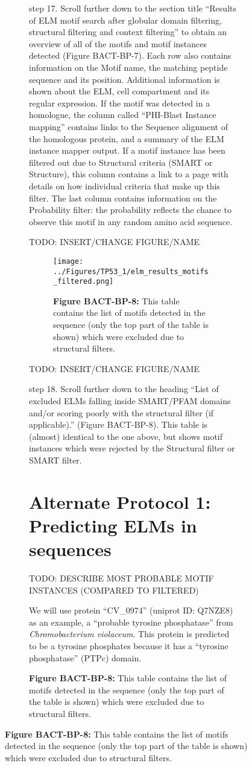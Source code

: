 {\begin{figure}[h!]
{{\begin{figure}[h!]
{{step 17. Scroll further down to the section title ``Results of ELM motif
search after globular domain filtering, structural filtering and context
filtering'' to obtain an overview of all of the motifs and motif
instances detected (Figure BACT-BP-7). Each row also contains
information on the Motif name, the matching peptide sequence and its
position. Additional information is shown about the ELM, cell
compartment and its regular expression. If the motif was detected in a
homologue, the column called ``PHI-Blast Instance mapping'' contains
links to the Sequence alignment of the homologous protein, and a summary
of the ELM instance mapper output. If a motif instance has been filtered
out due to Structural criteria (SMART or Structure), this column
contains a link to a page with details on how individual criteria that
make up this filter. The last column contains information on the
Probability filter: the probability reflects the chance to observe this
motif in any random amino acid sequence.

TODO: INSERT/CHANGE FIGURE/NAME

\begin{figure}[h!]
\centering
\texttt{[image: ../Figures/TP53\_1/elm\_results\_motifs\_filtered.png]}
\caption{
\textbf{Figure BACT-BP-8:} This table contains the list of motifs
detected in the sequence (only the top part of the table is shown) which
were excluded due to structural filters.
}
\end{figure}

TODO: INSERT/CHANGE FIGURE/NAME

step 18. Scroll further down to the heading ``List of excluded ELMs
falling inside SMART/PFAM domains and/or scoring poorly with the
structural filter (if applicable).'' (Figure BACT-BP-8). This table is
(almost) identical to the one above, but shows motif instances which
were rejected by the Structural filter or SMART filter.

\section{Alternate Protocol 1: Predicting ELMs in
sequences}\label{alternate-protocol-1-predicting-elms-in-sequences}

TODO: DESCRIBE MOST PROBABLE MOTIF INSTANCES (COMPARED TO FILTERED)

We will use protein ``CV\_0974'' (uniprot ID: Q7NZE8) as an example, a
``probable tyrosine phosphatase'' from \emph{Chromobacterium violaceum}.
This protein is predicted to be a tyrosine phosphates because it has a
``tyrosine phosphatase'' (PTPc) domain.

}}
\end{figure}}}
\end{figure}}
